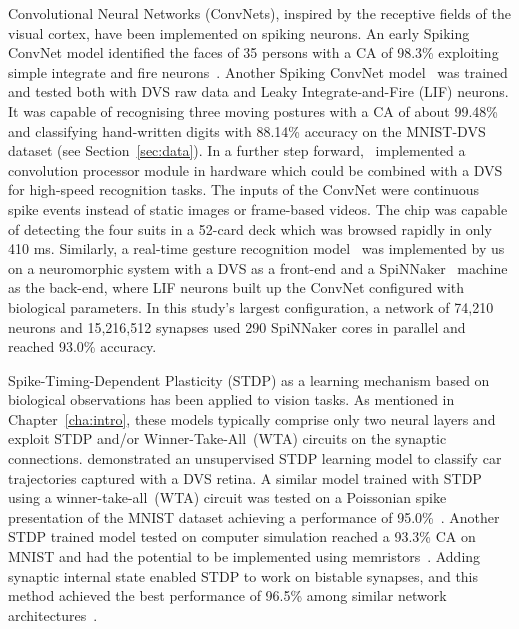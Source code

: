 Convolutional Neural Networks (ConvNets), inspired by the receptive fields of the visual cortex, have been implemented on spiking neurons.
An early Spiking ConvNet model identified the faces of 35 persons with a CA of 98.3\% exploiting simple integrate and fire neurons~\citep{matsugu2002convolutional}.
Another Spiking ConvNet model~\citep{zhao2014feedforward} was trained and tested both with DVS raw data and Leaky Integrate-and-Fire (LIF) neurons.
It was capable of recognising three moving postures with a CA of about 99.48\% and classifying hand-written digits with 88.14\% accuracy on the MNIST-DVS dataset (see Section~\ref{sec:data}).
In a further step forward,~\citet{camunas2012event} implemented a convolution processor module in hardware which could be combined with a DVS for high-speed recognition tasks.
The inputs of the ConvNet were continuous spike events instead of static images or frame-based videos. 
The chip was capable of detecting the four suits in a 52-card deck which was browsed rapidly in only 410 ms.
Similarly, a real-time gesture recognition model~\citep{liu2014real} was implemented by us on a neuromorphic system with a DVS as a front-end and a SpiNNaker~\citep{furber2014spinnaker} machine as the back-end, where LIF neurons built up the ConvNet configured with biological parameters.
In this study's largest configuration, a network of 74,210 neurons and 15,216,512 synapses used 290 SpiNNaker cores in parallel and reached 93.0\% accuracy. 

Spike-Timing-Dependent Plasticity (STDP) as a learning mechanism based on biological observations has been applied to vision tasks.
As mentioned in Chapter~\ref{cha:intro}, these models typically comprise only two neural layers and exploit STDP and/or Winner-Take-All~(WTA) circuits on the synaptic connections.
\citet{bichler2012extraction} demonstrated an unsupervised STDP learning model to classify car trajectories captured with a DVS retina. 
A similar model trained with STDP using a winner-take-all~(WTA) circuit was tested on a Poissonian spike presentation of the MNIST dataset achieving a performance of 95.0\%~\citep{diehl2015unsupervised}.
Another STDP trained model tested on computer simulation reached a 93.3\% CA on MNIST and had the potential to be implemented using memristors~\citep{bill2014compound}. 
Adding synaptic internal state enabled STDP to work on bistable synapses, and this method achieved the best performance of 96.5\% among similar network architectures~\citep{brader2007learning}. 

